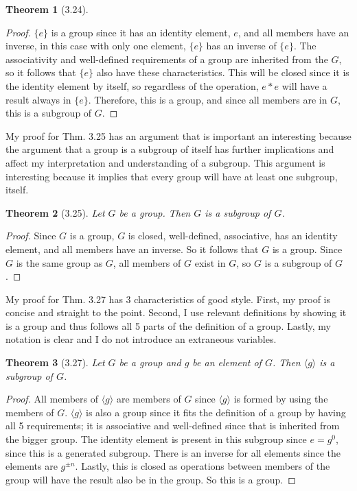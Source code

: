 \documentclass{article}
\newtheorem*{thm}{Theorem}
\begin{document}
\begin{description}
\begin{thm}[3.24]
		\end{thm}
	      \begin{proof}
	      $\{e\}$ is a group since it has an identity element, $e$, and all members have an inverse, in this case with only one element, $\{e\}$ has
	an inverse of $\{e\}$. The associativity and well-defined requirements of a group are inherited from the $G$, so it follows that $\{e\}$ also
	have these characteristics. This will be closed since it is the identity element by itself, so regardless of the operation, $e*e$ will
	have a result always in $\{e\}$. Therefore, this is a group, and since all members are in $G$, this is a subgroup of $G$.

	      \end{proof}

	      My proof for Thm. 3.25 has an argument that is important an interesting because the argument that a group is a subgroup of itself 
	      has further implications and affect my interpretation and understanding of a subgroup. 
	      This argument is interesting because it implies that every group will have at least one subgroup, itself. 
		\begin{thm}[3.25]
			Let $G$ be a group. Then $G$ is a subgroup of $G$. 

		\end{thm}
		\begin{proof}
		 Since $G$ is a group, $G$ is closed, well-defined, associative, has an identity element, and all members have an inverse. So it follows
	that $G$ is a group. Since $G$ is the same group as $G$, all members of $G$ exist in $G$, so $G$ is a subgroup of $G$.

		\end{proof}


		My proof for Thm. 3.27 has 3 characteristics of good style. First, my proof is concise and straight to the point.
		Second, I use relevant definitions by showing it is a group and thus follows all 5 parts of the definition of a group.
		Lastly, my notation is clear and I do not introduce an extraneous variables. 
		\begin{thm}[3.27]
		  	Let $G$ be a group and $g$ be an element of $G$. Then $\langle g \rangle$ is a subgroup of $G$. 

	      
		\end{thm}
	      \begin{proof}
	      All members of $\langle g \rangle$ are members of $G$ since $\langle g \rangle$ is formed by using the members of $G$. $\langle g \rangle$
	is also a group since it fits the definition of a group by having all 5 requirements; it is associative and well-defined since 
	that is inherited from the bigger group. The identity element 
	is present in this subgroup since $e = g^0$, since this is a generated subgroup.  
	There is an inverse for all elements since the elements
	are $g^{\pm n}$. Lastly, this is closed as operations between members of the group will have the result also be in the group. So this is a 
	group. 
	      \end{proof}



\end{description}
\end{document}
